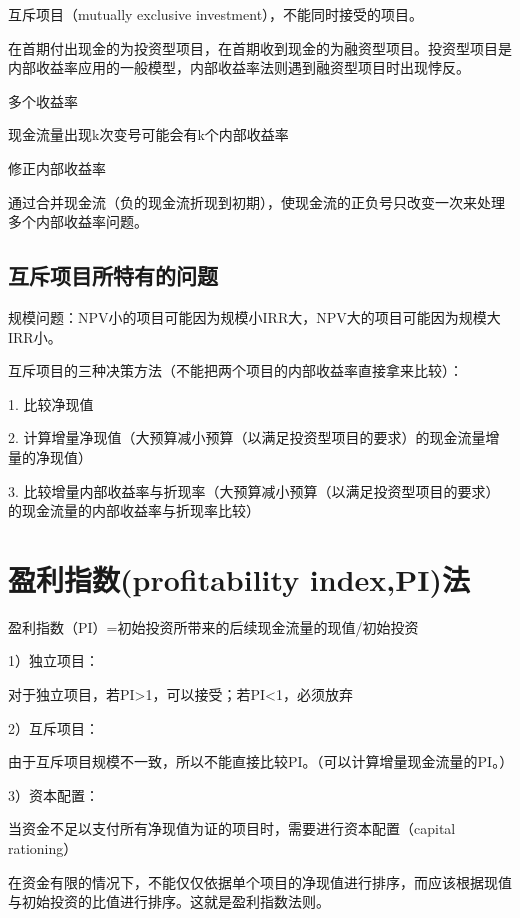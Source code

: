 \documentclass{article}
\begin{document}
互斥项目（mutually exclusive investment），不能同时接受的项目。

在首期付出现金的为投资型项目，在首期收到现金的为融资型项目。投资型项目是内部收益率应用的一般模型，内部收益率法则遇到融资型项目时出现悖反。

\hspace*{\fill}

多个收益率

现金流量出现k次变号可能会有k个内部收益率

\hspace*{\fill}

修正内部收益率

通过合并现金流（负的现金流折现到初期），使现金流的正负号只改变一次来处理多个内部收益率问题。

\subsection{互斥项目所特有的问题}
规模问题：NPV小的项目可能因为规模小IRR大，NPV大的项目可能因为规模大IRR小。

互斥项目的三种决策方法（不能把两个项目的内部收益率直接拿来比较）：

1. 比较净现值

2. 计算增量净现值（大预算减小预算（以满足投资型项目的要求）的现金流量增量的净现值）

3. 比较增量内部收益率与折现率（大预算减小预算（以满足投资型项目的要求）的现金流量的内部收益率与折现率比较）

\section{盈利指数(profitability index,PI)法}
盈利指数（PI）=初始投资所带来的后续现金流量的现值/初始投资

1）独立项目：

对于独立项目，若PI>1，可以接受；若PI<1，必须放弃

2）互斥项目：

由于互斥项目规模不一致，所以不能直接比较PI。（可以计算增量现金流量的PI。）

3）资本配置：

当资金不足以支付所有净现值为证的项目时，需要进行资本配置（capital rationing）

在资金有限的情况下，不能仅仅依据单个项目的净现值进行排序，而应该根据现值与初始投资的比值进行排序。这就是盈利指数法则。
\end{document}
